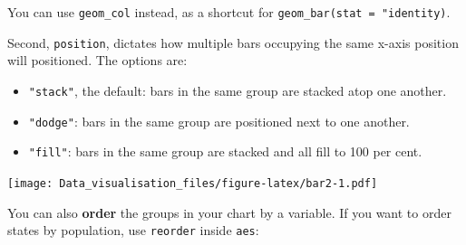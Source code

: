 \documentclass[]{book}
\newenvironment{Shaded}{\begin{snugshade}}{\end{snugshade}}
\newcommand{\DataTypeTok}[1]{\textcolor[rgb]{0.13,0.29,0.53}{#1}}
\newcommand{\DecValTok}[1]{\textcolor[rgb]{0.00,0.00,0.81}{#1}}
\newcommand{\KeywordTok}[1]{\textcolor[rgb]{0.13,0.29,0.53}{\textbf{#1}}}
\newcommand{\NormalTok}[1]{#1}
\newcommand{\OperatorTok}[1]{\textcolor[rgb]{0.81,0.36,0.00}{\textbf{#1}}}
\newcommand{\StringTok}[1]{\textcolor[rgb]{0.31,0.60,0.02}{#1}}
\providecommand{\tightlist}{%
  \setlength{\itemsep}{0pt}\setlength{\parskip}{0pt}}
\begin{document}
You can use \texttt{geom\_col} instead, as a shortcut for \texttt{geom\_bar(stat\ =\ "identity)}.

Second, \texttt{position}, dictates how multiple bars occupying the same x-axis position will positioned. The options are:

\begin{itemize}
\tightlist
\item
  \texttt{"stack"}, the default: bars in the same group are stacked atop one another.
\item
  \texttt{"dodge"}: bars in the same group are positioned next to one another.
\item
  \texttt{"fill"}: bars in the same group are stacked and all fill to 100 per cent.
\end{itemize}

\begin{Shaded}
\end{Shaded}

\texttt{[image: Data\_visualisation\_files/figure-latex/bar2-1.pdf]}

You can also \textbf{order} the groups in your chart by a variable. If you want to order states by population, use \texttt{reorder} inside \texttt{aes}:
\end{document}
